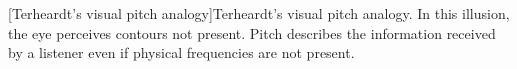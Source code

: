 [Terheardt's visual pitch analogy]Terheardt's visual pitch analogy. In this illusion, the eye perceives contours not present. Pitch describes the information received by a listener even if physical frequencies are not present.